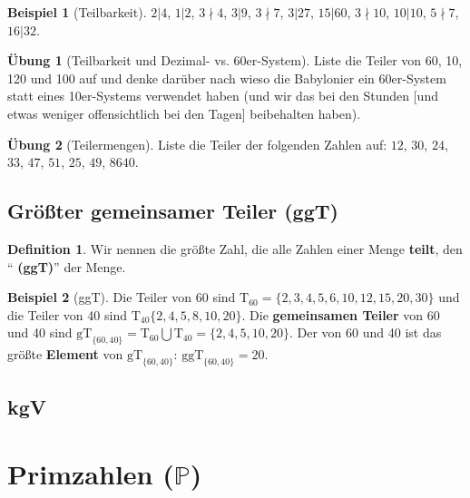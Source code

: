 \documentclass[a4paper]{book}%
\theoremstyle{definition}
\newtheorem{definition}{Definition}
\newtheorem{uebung}{Übung}
\newtheorem{beispiel}{Beispiel}
\begin{document}
\begin{beispiel}[Teilbarkeit]
    $2 | 4$, $1 | 2$, $3 \nmid 4$, $3 | 9$, $3 \nmid 7$, $3 | 27$, $15 | 60$, $3 \nmid 10$, $10 | 10$, $ 5 \nmid 7$, $16 | 32$.
\end{beispiel}

\begin{uebung}[Teilbarkeit und Dezimal- vs. 60er-System]
    Liste die Teiler von 60, 10, 120 und 100 auf und denke darüber nach wieso die Babylonier ein 60er-System statt eines 10er-Systems verwendet haben (und wir das bei den Stunden [und etwas weniger offensichtlich bei den Tagen] beibehalten haben).
\end{uebung}

\begin{uebung}[Teilermengen]
    Liste die Teiler der folgenden Zahlen auf: $12$, $30$, $24$, $33$, $47$, $51$, $25$, $49$, $8640$.
\end{uebung}


\subsection{Größter gemeinsamer Teiler (ggT)}

\begin{definition}
    Wir nennen die größte Zahl, die alle Zahlen einer Menge \textbf{teilt}, den \enquote{\textbf{ (ggT)}} der Menge.
\end{definition}

\begin{beispiel}[ggT]
    Die Teiler von 60 sind $\text{T}_{60} = \{2,3,4,5,6,10,12,15,20,30\}$ und die Teiler von 40 sind $\text{T}_{40}\{2,4,5,8,10,20\}$. Die \textbf{gemeinsamen Teiler} von 60 und 40 sind $\text{gT}_{\{60,40\}} = \text{T}_{60} \bigcup \text{T}_{40} = \{2,4,5,10,20\}$. Der \textbf{} von 60 und 40 ist das größte \textbf{Element} von $\text{gT}_{\{60,40\}}$: $\text{ggT}_{\{60,40\}}=20$.
\end{beispiel}


\subsection{kgV}



\section{Primzahlen ($\mathbb{P}$)}
\end{document}

